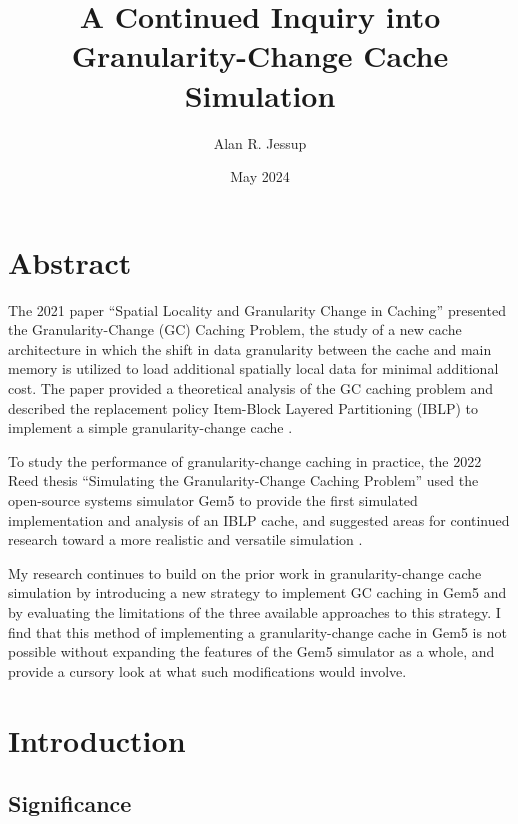 \documentclass[12pt,twoside]{reedthesis}
\title{A Continued Inquiry into Granularity-Change Cache Simulation}
\author{Alan R. Jessup}
\date{May 2024}
\begin{document}
\maketitle
\frontmatter %
\pagestyle{empty}

\tableofcontents

\chapter*{Abstract}

The 2021 paper ``Spatial Locality and Granularity Change in Caching'' presented the Granularity-Change (GC) Caching Problem, the study of a new cache architecture in which the shift in data granularity between the cache and main memory is utilized to load additional spatially local data for minimal additional cost. The paper provided a theoretical analysis of the GC caching problem and described the replacement policy Item-Block Layered Partitioning (IBLP) to implement a simple granularity-change cache \cite{beckmann}.

To study the performance of granularity-change caching in practice, the 2022 Reed thesis ``Simulating the Granularity-Change Caching Problem'' used the open-source systems simulator Gem5 to provide the first simulated implementation and analysis of an IBLP cache, and suggested areas for continued research toward a more realistic and versatile simulation \cite{curtis}.

My research continues to build on the prior work in granularity-change cache simulation by introducing a new strategy to implement GC caching in Gem5 and by evaluating the limitations of the three available approaches to this strategy. I find that this method of implementing a granularity-change cache in Gem5 is not possible without expanding the features of the Gem5 simulator as a whole, and provide a cursory look at what such modifications would involve.

\mainmatter
\pagestyle{fancyplain}

\chapter{Introduction}

\section{Significance}
\end{document}
